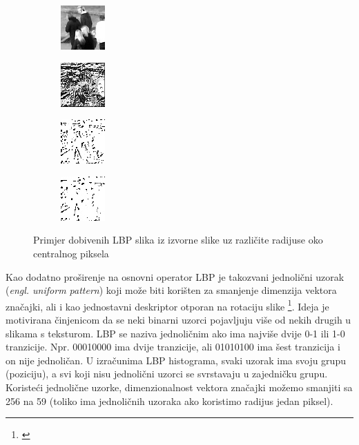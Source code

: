 \documentclass[times, utf8, zavrsni]{fer}
\begin{document}
\begin{figure}[ht]
\begin{subfigure}[b]{0.24\linewidth}
\centering
\includegraphics{img/1.jpg}
\end{subfigure}
\begin{subfigure}[b]{0.24\linewidth}
\centering
\includegraphics{img/2.jpg}
\end{subfigure}
\begin{subfigure}[b]{0.24\linewidth}
\centering
\includegraphics{img/3.jpg}
\end{subfigure}
\begin{subfigure}[b]{0.24\linewidth}
\centering
\includegraphics{img/4.jpg}
\end{subfigure}

\caption{Primjer dobivenih LBP slika iz izvorne slike uz različite radijuse oko centralnog piksela}
\end{figure}

Kao dodatno proširenje na osnovni operator LBP je takozvani jednolični uzorak 
(\textit{engl. uniform pattern}) koji može biti korišten za smanjenje dimenzija
vektora značajki, ali i kao jednostavni deskriptor otporan na rotaciju slike 
\footnote{\cite{barkan}}. Ideja je motivirana činjenicom da se neki 
binarni uzorci pojavljuju više od nekih drugih u slikama s teksturom. 
LBP se naziva jednoličnim ako ima najviše dvije 0-1 ili 1-0 tranzicije.
 Npr. 00010000 ima dvije tranzicije, ali 01010100 ima šest tranzicija 
 i on nije jednoličan. U izračunima LBP histograma, svaki uzorak ima 
 svoju grupu (poziciju), a svi koji nisu jednolični uzorci se 
 svrstavaju u zajedničku grupu. Koristeći jednolične uzorke,
  dimenzionalnost vektora značajki možemo smanjiti sa 256 na 59 
  (toliko ima jednoličnih uzoraka ako koristimo radijus jedan piksel).
\end{document}
